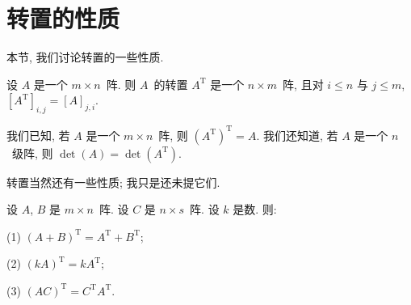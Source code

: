 \documentclass[../libro.tex]{subfiles}
\begin{document}

\section{转置的性质}

本节, 我们讨论转置的一些性质.

设 \(A\) 是一个 \(m \times n\)~阵.
则 \(A\)~的转置 \(A^{\mathrm{T}}\) 是一个 \(n \times m\)~阵,
且对 \(i \leq n\) 与 \(j \leq m\),
\([A^{\mathrm{T}}]_{i,j} = [A]_{j,i}\).

我们已知, 若 \(A\) 是一个 \(m \times n\)~阵,
则 \((A^{\mathrm{T}})^{\mathrm{T}} = A\).
我们还知道, 若 \(A\) 是一个 \(n\)~级阵,
则 \(\det {(A)} = \det {(A^{\mathrm{T}})}\).

转置当然还有一些性质;
我只是还未提它们.

\begin{theorem}
    设 \(A\), \(B\) 是 \(m \times n\)~阵.
    设 \(C\) 是 \(n \times s\)~阵.
    设 \(k\) 是数.
    则:

    (1)
    \((A + B)^{\mathrm{T}} = A^{\mathrm{T}} + B^{\mathrm{T}}\);

    (2)
    \((k A)^{\mathrm{T}} = k A^{\mathrm{T}}\);

    (3)
    \((A C)^{\mathrm{T}} = C^{\mathrm{T}} A^{\mathrm{T}}\).
\end{theorem}
\end{document}
